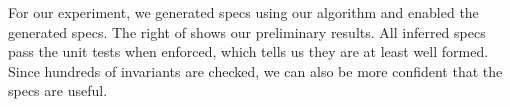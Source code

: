 \label{infer:sec:experiment3}

For our experiment, we generated specs using our algorithm and enabled
the generated specs. The right of  shows
our preliminary results. All inferred specs pass the unit
tests when enforced, which tells us they are at least well formed.
Since hundreds of invariants are checked, we can also be more confident
that the specs are useful.




% 
% 
%
% 
